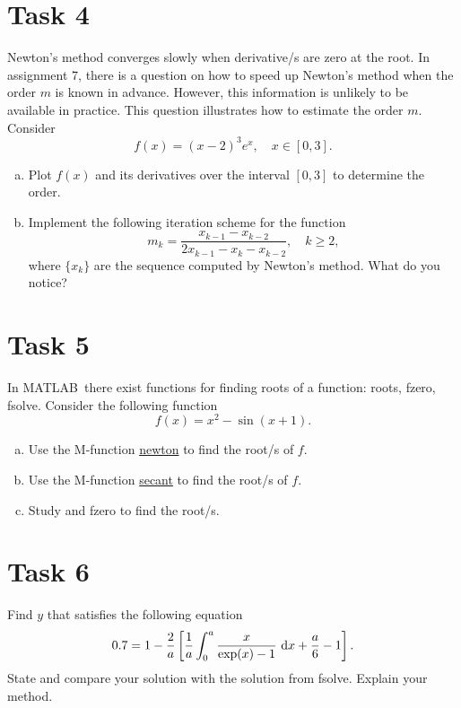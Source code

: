 \section*{Task 4}
Newton's method converges slowly when derivative/s are zero at the root.
In assignment 7, there is a question on how to speed up Newton's method when the order \(m\) is known in advance.
However, this information is unlikely to be available in practice.
This question illustrates how to estimate the order \(m\).
Consider
\[ f(x)=(x-2)^3 e^x, \quad x\in[0,3]. \]
\begin{enumerate}[(a)]
	\item Plot \(f(x)\) and its derivatives over the interval \([0, 3]\) to determine the order.
	\item Implement the following iteration scheme for the function
	\[ m_k=\frac{x_{k-1}-x_{k-2}}{2x_{k-1}-x_k-x_{k-2}}, \quad k\geq 2, \]
	where \(\{x_k\}\) are the sequence computed by Newton's method.
	What do you notice?
\end{enumerate}


\section*{Task 5}
In MATLAB\texttrademark\ there exist functions for finding roots of a function: {\color{blue}roots, fzero, fsolve}.
Consider the following function
\[ f(x)=x^2-\sin(x+1). \]
\begin{enumerate}[(a)]
	\item Use the M-function \hyperref[newton]{newton} to find the root/s of \(f\).
	\item Use the M-function \hyperref[secant]{secant} to find the root/s of \(f\).
	\item Study and {\color{blue}fzero} to find the root/s.
\end{enumerate}


\section*{Task 6}
Find \(y\) that satisfies the following equation
\[ 0.7=1-\frac{2}{a}\left[\frac{1}{a}\int_0^a\frac{x}{\exp(x)-1}~\mathrm{d} x+\frac{a}{6}-1 \right]. \]
State and compare your solution with the solution from {\color{blue}fsolve}.
Explain your method.